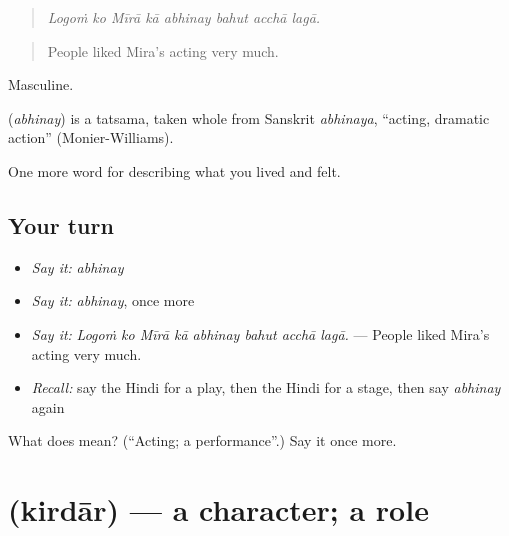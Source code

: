 \begin{quote}
       
\end{quote}

\begin{quote}
\emph{Logoṁ ko Mīrā kā abhinay bahut acchā lagā.}
\end{quote}

\begin{quote}
People liked Mira's acting very much.
\end{quote}

Masculine.

\begin{cousinweb}
\textbf{} (\emph{abhinay}) is a tatsama, taken whole from Sanskrit \emph{abhinaya}, \textquotedblleft{}acting, dramatic action\textquotedblright{} (Monier-Williams).
\end{cousinweb}

\begin{grammarlens}[title={What you've built}]
One more word for describing what you lived and felt.
\end{grammarlens}

\subsection*{Your turn}
\begin{itemize}
\raggedright
  \item \emph{Say it:} \emph{abhinay}
  \item \emph{Say it:} \emph{abhinay}, once more
  \item \emph{Say it:} \emph{Logoṁ ko Mīrā kā abhinay bahut acchā lagā.} — People liked Mira's acting very much.
  \item \emph{Recall:} say the Hindi for a play, then the Hindi for a stage, then say \emph{abhinay} again
\end{itemize}

\begin{tcolorbox}[breakable,colback=teal!4,colframe=teal!35!black,title={Before you move on}]
What does  mean? (\textquotedblleft{}Acting; a performance\textquotedblright{}.) Say it once more.
\end{tcolorbox}
\section[\texorpdfstring{\hi{किरदार} (kirdār)}{किरदार (kirdār)}]{ (kirdār) — a character; a role}

